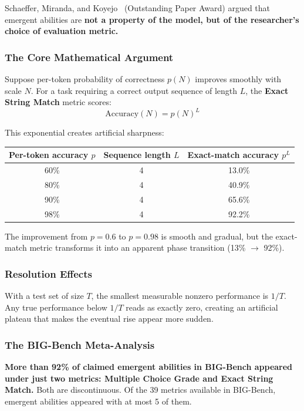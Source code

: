 \documentclass[11pt, a4paper]{article}
\theoremstyle{definition}
\theoremstyle{plain}
\begin{document}
Schaeffer, Miranda, and Koyejo~\cite{schaeffer2023mirage} (Outstanding Paper Award) argued that emergent abilities are \textbf{not a property of the model, but of the researcher's choice of evaluation metric.}

\subsubsection{The Core Mathematical Argument}

Suppose per-token probability of correctness $p(N)$ improves smoothly with scale $N$. For a task requiring a correct output sequence of length $L$, the \textbf{Exact String Match} metric scores:
\begin{equation}
  \text{Accuracy}(N) = p(N)^L
  \label{eq:exactmatch}
\end{equation}

This exponential creates artificial sharpness:
\begin{center}
\begin{tabular}{ccc}
  \toprule
  Per-token accuracy $p$ & Sequence length $L$ & Exact-match accuracy $p^L$ \\
  \midrule
  60\% & 4 & 13.0\% \\
  80\% & 4 & 40.9\% \\
  90\% & 4 & 65.6\% \\
  98\% & 4 & 92.2\% \\
  \bottomrule
\end{tabular}
\end{center}

The improvement from $p = 0.6$ to $p = 0.98$ is smooth and gradual, but the exact-match metric transforms it into an apparent phase transition (13\% $\to$ 92\%).

\subsubsection{Resolution Effects}

With a test set of size $T$, the smallest measurable nonzero performance is $1/T$. Any true performance below $1/T$ reads as exactly zero, creating an artificial plateau that makes the eventual rise appear more sudden.

\subsubsection{The BIG-Bench Meta-Analysis}

\textbf{More than 92\% of claimed emergent abilities in BIG-Bench appeared under just two metrics: Multiple Choice Grade and Exact String Match.} Both are discontinuous. Of the 39 metrics available in BIG-Bench, emergent abilities appeared with at most 5 of them.
\end{document}
